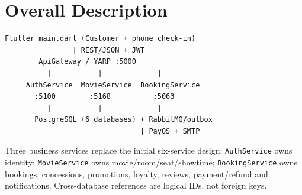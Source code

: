\clearpage
\section{Overall Description}\label{sec:srs-4}
\begin{Verbatim}
Flutter main.dart (Customer + phone check-in)
                | REST/JSON + JWT
        ApiGateway / YARP :5000
          |           |             |
     AuthService  MovieService  BookingService
       :5100        :5168          :5063
          |           |             |
       PostgreSQL (6 databases) + RabbitMQ/outbox
                                | PayOS + SMTP
\end{Verbatim}
Three business services replace the initial six-service design: \texttt{Auth\allowbreak{}Service} owns identity; \texttt{Movie\allowbreak{}Service} owns movie/\allowbreak{}room/\allowbreak{}seat/\allowbreak{}showtime; \texttt{Booking\allowbreak{}Service} owns bookings, concessions, promotions, loyalty, reviews, payment/\allowbreak{}refund and notifications. Cross-database references are logical IDs, not foreign keys.
